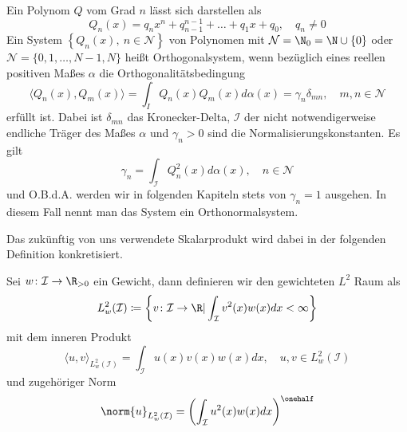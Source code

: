 \begin{mathdef}
Ein Polynom $Q$ vom Grad $n$ lässt sich darstellen als
\[Q_n(x)=q_nx^n+q_{n-1}^{n-1}+\dots+q_1x+q_0,\quad q_n\ne 0\]
Ein System $\left\lbrace Q_n(x),\: n\in\mathcal{N}\right\rbrace$ von Polynomen mit $\mathcal{N}=\N_0=\N\cup\lbrace 0\rbrace$ oder $\mathcal{N}=\lbrace 0,1,\dots,N-1,N\rbrace$ heißt Orthogonalsystem, wenn bezüglich eines reellen positiven Maßes $\alpha$ die Orthogonalitätsbedingung
 \[\langle Q_n(x),Q_m(x)\rangle =\int_I Q_n(x)Q_m(x)d\alpha(x)=\gamma_n\delta_{mn},\quad m,n\in\mathcal{N}\]
 erfüllt ist. Dabei ist $\delta_{mn}$ das Kronecker-Delta, $\mathcal{I}$ der nicht notwendigerweise endliche Träger des Maßes $\alpha$ und $\gamma_n>0$ sind die Normalisierungskonstanten. Es gilt 
 \[\gamma_n=\int_\mathcal{I} Q_n^2(x)d\alpha(x),\quad n\in\mathcal{N}\] und O.B.d.A. werden wir in folgenden Kapiteln stets von $\gamma_n=1$ ausgehen. In diesem Fall nennt man das System ein Orthonormalsystem.
\end{mathdef}
Das zukünftig von uns verwendete Skalarprodukt wird dabei in der folgenden Definition konkretisiert.
\begin{mathdef}
Sei $w\colon \mathcal{I}\to\R_{>0}$ ein Gewicht, dann definieren wir den gewichteten $L^2$ Raum als
\begin{equation*}
L_w^2(\mathcal{I})\coloneqq \left\lbrace v\colon \mathcal{I}\to\R | \int_\mathcal{I}v^2(x)w(x)dx<\infty\right\rbrace
\end{equation*}
mit dem inneren Produkt 
\[\langle u,v\rangle_{L_w^2(\mathcal{I})}=\int_\mathcal{I} u(x)v(x)w(x)dx,\quad u,v\in L_w^2(\mathcal{I})\]
und zugehöriger Norm
\[\norm{u}_{L_w^2(\mathcal{I})}=\left(\int_\mathcal{I} u^2(x)w(x)dx\right)^{\onehalf}\]
\end{mathdef}

